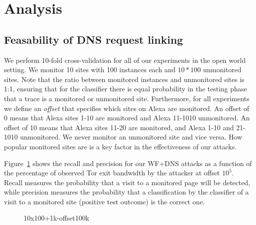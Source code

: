 \section{Analysis}
\label{sec:analysis}

\subsection{Feasability of DNS request linking}
We perform 10-fold cross-validation for all of our experiments in the open
world setting. We monitor 10 sites with 100 instances each and
$10*100$ unmonitored sites.
Note that the ratio between monitored instances and unmonitored sites is 1:1,
ensuring that for the classifier there is equal probability in the testing
phase that a trace is a monitored or unmonitored site.
Furthermore, for all experiments we define an \emph{offset} that specifies
which sites on Alexa are monitored. An offset of 0 means that Alexa sites 1-10
are monitored and Alexa 11-1010 unmonitored. An offset of 10 means that
Alexa sites 11-20 are monitored, and Alexa 1-10 and 21-1010 unmonitored. We
never monitor an unmonitored site and vice versa. How popular monitored sites
are is a key factor in the effectiveness of our attacks.

Figure~\ref{fig:wfdns:torpct} shows the recall and precision for our WF+DNS
attacks as a function of the percentage of observed Tor exit bandwidth by the
attacker at offset $10^5$.
Recall measures the probability that a visit to a monitored page will
be detected, while precision measures the probability that a classification by
the classifier of a visit to a monitored site (positive test outcome) is the
correct one.

\begin{figure}[t]
\centering
{}
\caption{10x100+1k-offset100k}
\label{fig:wfdns:torpct}
\end{figure}

